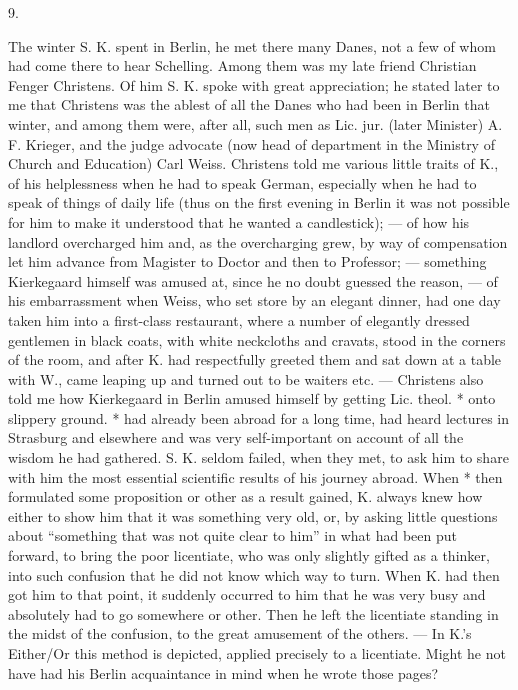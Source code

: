 \documentclass[12pt,a4paper,openany]{book}
\newcommand{\secnum}[1]{\par\begin{center}#1\end{center}\par\nobreak}
\newcommand{\opage}[1]{\marginnote{\footnotesize\textit{[#1]}}}
\begin{document}
\secnum{9.}

The winter S. K. spent in Berlin, he met there
many Danes, not a few of whom had
come there to hear Schelling. Among them was
my late friend Christian Fenger Christens. Of him
S. K. spoke with great appreciation; he stated later
to me that Christens was the ablest of all the Danes
who had been in Berlin that winter, and among them
were, after all, such men as Lic. jur. (later Minister)
A. F. Krieger, and the judge advocate (now head of department in the Ministry of Church and Education)
Carl Weiss. Christens told me various
little traits of K., of his helplessness when he
had to speak German, especially when he had to speak of things
of daily life (thus on the first evening in Berlin
it was not possible for him to make it understood that he
wanted a candlestick); --- of how his landlord
overcharged him and, as the overcharging grew, by way of compensation
let him advance from Magister to Doctor and then
to Professor; --- something Kierkegaard himself was amused
at, since he no doubt guessed the reason, --- of his embarrassment
when Weiss, who set store by an elegant dinner, had one day
taken him into a first-class restaurant,
where a number of elegantly dressed gentlemen in black coats,
with white neckcloths and cravats, stood in the corners
of the room, and after K. had respectfully greeted them
\opage{345}and sat down at a table with W., came leaping up and turned out
to be waiters etc. --- Christens also told me
how Kierkegaard in Berlin amused himself by
getting Lic. theol. * onto slippery ground. * had already been
abroad for a long time, had heard lectures in
Strasburg and elsewhere and was very self-important on
account of all the wisdom he had gathered. S. K.
seldom failed, when they met, to ask him
to share with him the most essential scientific results
of his journey abroad. When * then formulated some proposition
or other as a result gained, K. always knew how
either to show him that it was something very old,
or, by asking little questions about ``something that was not
quite clear to him'' in what had been put forward, to bring the
poor licentiate, who was only slightly gifted as a thinker,
into such confusion that he did not know which way
to turn. When K. had then got him to that point,
it suddenly occurred to him that he was very
busy and absolutely had to go somewhere or other.
Then he left the licentiate standing in the midst of the confusion, to the great
amusement of the others. --- In K.'s Either/Or
this method is depicted, applied precisely to a licentiate. Might
he not have had his Berlin acquaintance in
mind when he wrote those pages?
\end{document}
